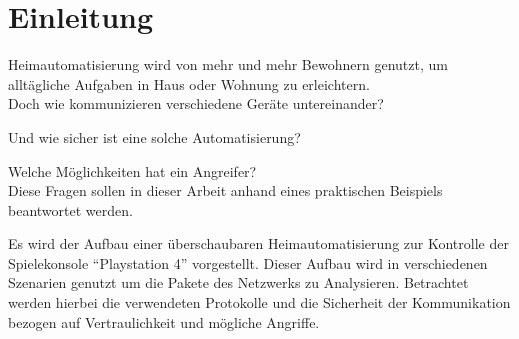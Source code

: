 \newpage
\section{Einleitung}\label{sec:einleitung}
Heimautomatisierung wird von mehr und mehr Bewohnern genutzt,
um alltägliche Aufgaben in Haus oder Wohnung zu erleichtern.\\

Doch wie kommunizieren verschiedene Geräte untereinander?

Und wie sicher ist eine solche Automatisierung?

Welche Möglichkeiten hat ein Angreifer?\\

Diese Fragen sollen in dieser Arbeit anhand eines praktischen Beispiels beantwortet werden.

Es wird der Aufbau einer überschaubaren Heimautomatisierung zur Kontrolle der Spielekonsole \enquote{Playstation 4} vorgestellt.
Dieser Aufbau wird in verschiedenen Szenarien genutzt um die Pakete des Netzwerks zu Analysieren.
Betrachtet werden hierbei die verwendeten Protokolle und die Sicherheit der Kommunikation bezogen auf Vertraulichkeit und mögliche Angriffe.
